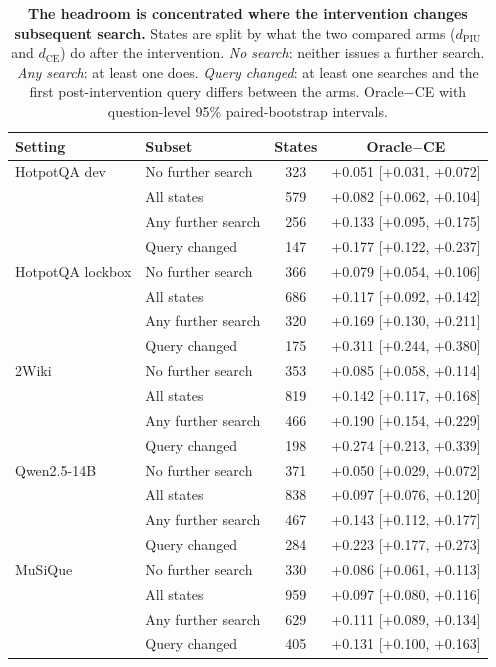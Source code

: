 \begin{table}[t]
\centering
\small
\caption{\textbf{The headroom is concentrated where the intervention
changes subsequent search.} States are split by what the two compared
arms ($d_{\mathrm{PIU}}$ and $d_{\mathrm{CE}}$) do after the
intervention. \emph{No search}: neither issues a further search.
\emph{Any search}: at least one does. \emph{Query changed}: at least one
searches and the first post-intervention query differs between the arms.
Oracle$-$CE with question-level 95\% paired-bootstrap intervals.}
\label{tab:w1}
\begin{tabular}{llcc}
\toprule
\textbf{Setting} & \textbf{Subset} & \textbf{States} & \textbf{Oracle$-$CE} \\
\midrule
HotpotQA dev & No further search & 323 & +0.051 [+0.031, +0.072] \\
 & All states & 579 & +0.082 [+0.062, +0.104] \\
 & Any further search & 256 & +0.133 [+0.095, +0.175] \\
 & Query changed & 147 & +0.177 [+0.122, +0.237] \\
\midrule
HotpotQA lockbox & No further search & 366 & +0.079 [+0.054, +0.106] \\
 & All states & 686 & +0.117 [+0.092, +0.142] \\
 & Any further search & 320 & +0.169 [+0.130, +0.211] \\
 & Query changed & 175 & +0.311 [+0.244, +0.380] \\
\midrule
2Wiki & No further search & 353 & +0.085 [+0.058, +0.114] \\
 & All states & 819 & +0.142 [+0.117, +0.168] \\
 & Any further search & 466 & +0.190 [+0.154, +0.229] \\
 & Query changed & 198 & +0.274 [+0.213, +0.339] \\
\midrule
Qwen2.5-14B & No further search & 371 & +0.050 [+0.029, +0.072] \\
 & All states & 838 & +0.097 [+0.076, +0.120] \\
 & Any further search & 467 & +0.143 [+0.112, +0.177] \\
 & Query changed & 284 & +0.223 [+0.177, +0.273] \\
\midrule
MuSiQue & No further search & 330 & +0.086 [+0.061, +0.113] \\
 & All states & 959 & +0.097 [+0.080, +0.116] \\
 & Any further search & 629 & +0.111 [+0.089, +0.134] \\
 & Query changed & 405 & +0.131 [+0.100, +0.163] \\
\bottomrule
\end{tabular}
\end{table}


